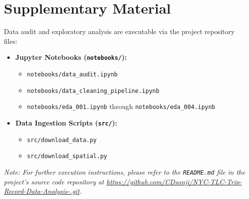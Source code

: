 \documentclass[11pt,a4paper]{article}
\begin{document}
\section{Supplementary Material}
Data audit and exploratory analysis are executable via the project repository files:
\begin{itemize}
    \item \textbf{Jupyter Notebooks (\texttt{notebooks/}):}
    \begin{itemize}
        \item \texttt{notebooks/data\_audit.ipynb}
        \item \texttt{notebooks/data\_cleaning\_pipeline.ipynb}
        \item \texttt{notebooks/eda\_001.ipynb} through \texttt{notebooks/eda\_004.ipynb}
    \end{itemize}
    \item \textbf{Data Ingestion Scripts (\texttt{src/}):}
    \begin{itemize}
        \item \texttt{src/download\_data.py}
        \item \texttt{src/download\_spatial.py}
    \end{itemize}
\end{itemize}

\noindent\textit{Note: For further execution instructions, please refer to the \texttt{README.md} file in the project's source code repository at \url{https://github.com/CDsonji/NYC-TLC-Trip-Record-Data-Analysis-.git}.}
\end{document}
